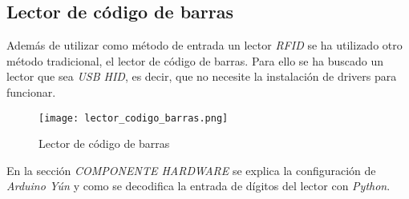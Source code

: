 \subsection{Lector de código de barras}

Además de utilizar como método de entrada un lector \emph{RFID} se ha utilizado otro método tradicional, el lector de código de barras. Para ello se ha buscado un lector que sea \emph{USB HID}, es decir, que no necesite la instalación de drivers para funcionar.

\begin{figure}[h!]
    \centering
    \texttt{[image: lector\_codigo\_barras.png]}
    \caption{Lector de código de barras}\label{fig:lector_codigo_barras}
\end{figure}

En la sección \emph{COMPONENTE HARDWARE} se explica la configuración de \emph{Arduino Yún} y como se decodifica la entrada de dígitos del lector con \emph{Python}.